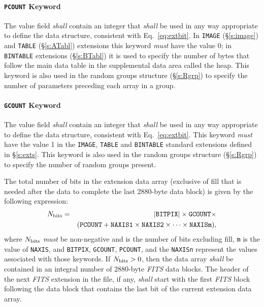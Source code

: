 \documentclass[11pt,makeidx]{book}     %
\begin{document}
   \paragraph{{\tt PCOUNT} Keyword}
 The value field {\em shall} contain an integer that {\em shall} be
 used in any way appropriate to define the data structure,
 consistent with Eq.\ \ref{eq:extbit}.  
 In {\tt IMAGE} (\S\ref{s:image}) and {\tt TABLE} (\S\ref{s:ATabl}) extensions
 this keyword {\em must} have the value 0; in {\tt BINTABLE} extensions (\S\ref{s:BTabl})
 it is used to specify the number of bytes 
 that follow the main data table in the supplemental data area called the heap. 
 This keyword is also used in the random groups structure (\S\ref{s:Rgrp})
 to specify the number of parameters preceding each array in a group.
 
   \paragraph{{\tt GCOUNT} Keyword}
 The value field {\em shall} contain an integer that {\em shall} be
 used in any way appropriate to define the data structure,
 consistent with Eq.\ \ref{eq:extbit}. 
 This keyword {\em must} have the value 1
 in the {\tt IMAGE}, {\tt TABLE} and {\tt BINTABLE} standard extensions 
 defined in \S\ref{s:exts}.
 This keyword is also used in the random groups structure (\S\ref{s:Rgrp})
 to specify the number of random groups present.
 
 The total number of bits in the extension data array 
 (exclusive of fill that is needed after the data to complete the last 2880-byte data block) 
 is given by the following expression:
\begin{eqnarray}  
   \mbox{$N_{\rm bits}$} &=&  
                     |\mbox{{\tt BITPIX}}| \times \label{eq:extbit}
                      \mbox{{\tt GCOUNT}} \times \nonumber \\
                & &  (\mbox{{\tt PCOUNT}} + \mbox{{\tt NAXIS1}} \times 
                 \mbox{{\tt NAXIS2}} \times  \cdots \times \mbox{{\tt
NAXISm}}),
\end{eqnarray}
 \noindent
 where $N_{\rm bits}$ {\em must} be
 non-negative and is the number of bits excluding fill, 
 {\tt m} is the value of {\tt NAXIS}, and
 {\tt BITPIX}, {\tt GCOUNT}, 
 {\tt PCOUNT}, and the {\tt NAXISn}
represent
 the values associated with those keywords.
If $N_{\rm bits} > 0$, then the
data array {\em shall} be contained in an integral number of
2880-byte {\em FITS} data blocks.  The header of the next {\em FITS\/} extension 
in the file, if any, {\em shall} start with the first {\em FITS\/} block following 
the data block that contains the last bit of the current extension data array.
     
\end{document}
